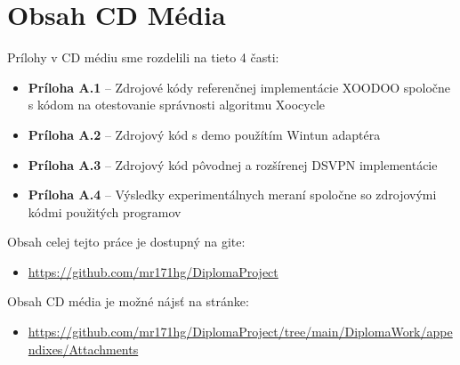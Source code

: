 
\chapter{Obsah CD Média} 

Prílohy v CD médiu sme rozdelili na tieto 4 časti:

\begin{itemize}
	\item \textbf{Príloha A.1} -- Zdrojové kódy referenčnej implementácie XOODOO spoločne s kódom na otestovanie správnosti algoritmu Xoocycle 
	\item\textbf{Príloha A.2} -- Zdrojový kód s demo použítím Wintun adaptéra 
	\item \textbf{Príloha A.3} -- Zdrojový kód pôvodnej a rozšírenej DSVPN implementácie
	\item \textbf{Príloha A.4} -- Výsledky experimentálnych meraní spoločne so zdrojovými kódmi použitých programov 
\end{itemize}

Obsah celej tejto práce je dostupný na gite:
\begin{itemize}
	\item \url{https://github.com/mr171hg/DiplomaProject}
\end{itemize}

Obsah CD média je možné nájsť na stránke:
\begin{itemize}
	\item \url{https://github.com/mr171hg/DiplomaProject/tree/main/DiplomaWork/appendixes/Attachments}
\end{itemize}

